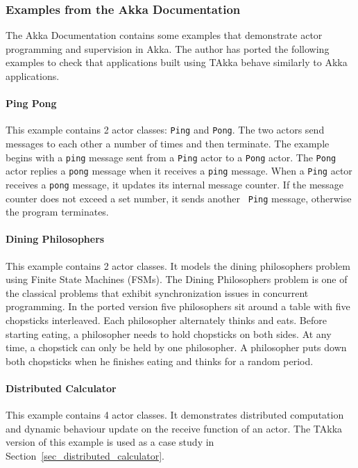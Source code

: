 \subsubsection{Examples from the Akka Documentation}

The Akka Documentation \citep{akka_doc} contains some examples that demonstrate 
actor programming and supervision in Akka.  The author has ported the 
following examples to check that applications built using TAkka behave similarly 
to Akka applications.

\paragraph{Ping Pong} This example contains 2 actor classes: {\tt Ping} and 
{\tt Pong}.  The two actors send messages to each other a number of 
times and then terminate.  The example begins with a {\tt ping} message sent 
from a {\tt Ping} actor to a {\tt Pong} actor.  The {\tt Pong} actor replies a 
{\tt pong} message when it receives a {\tt ping} message.  When a {\tt Ping} 
actor receives a {\tt pong} message, it updates its internal message counter.  
If the message counter does not exceed a set number, it sends another {\tt 
Ping} message, otherwise the program terminates.



\paragraph{Dining Philosophers} This example contains 2 actor classes.  It 
models the dining philosophers problem \citep{wiki:philosophers} using 
Finite State Machines (FSMs).   The Dining Philosophers problem is one of the 
classical problems that exhibit 
synchronization issues in concurrent programming.  In the ported version five 
philosophers sit around a table with five chopsticks interleaved.  Each 
philosopher alternately thinks and eats.  Before starting eating, a philosopher 
needs to hold chopsticks on both sides.  At any time, a chopstick can only be 
held by one philosopher.  A philosopher puts down both chopsticks when he 
finishes eating and thinks for a random period.  




\paragraph{Distributed Calculator} This example contains 4 actor classes.  
It demonstrates distributed computation and dynamic behaviour update on the 
receive function of an actor.  The TAkka version of this example is used as a 
case study in Section~\ref{sec_distributed_calculator}.

